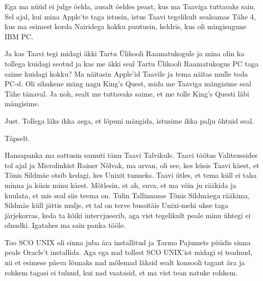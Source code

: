 
Ega ma nüüd ei julge öelda, ausalt öeldes peast, kus ma Taaviga tuttavaks sain. 
Sel ajal, kui mina Apple'te taga istusin, istus Taavi tegelikult sealsamas Tähe 
4, kus ma esimest korda Nairidega kokku puutusin, keldris, kus oli mingisugune 
IBM PC.

Ja kas Taavi tegi midagi äkki Tartu Ülikooli Raamatukogule ja mina olin ka tollega kuidagi seotud ja kas me äkki seal 
Tartu Ülikooli Raamatukogus PC taga saime kuidagi kokku? Ma näitasin Apple'id 
Taavile ja tema näitas mulle toda PC-d. Oli sihukene mäng nagu King's 
Quest, mida me Taaviga mängisime seal Tähe tänaval. 
Ja noh, sealt me tuttavaks saime, et me tolle King's Questi läbi mängisime.


Just. Tollega läks ikka aega, et lõpuni mängida,  istusime ikka palju õhtuid 
seal.


Täpselt. 


Hansapanka ma sattusin samuti tänu Taavi Talvikule. 
Taavi töötas Valitsussides tol ajal ja 
Microlinkist Rainer Nõlvak, ma 
arvan, oli see, kes küsis Taavi käest,  et Tõnis Sildmäe otsib kedagi, kes Unixit tunneks. Taavi ütles, et tema küll ei taha 
minna ja küsis minu käest. Mõtlesin, et ah, suva, et ma võin ju rääkida ja 
kuulata, et mis seal siis teema on. Tulin Tallinnasse Tõnis Sildmäega rääkima, 
Sildmäe küll jättis mulje, et tal on terve bussitäis Unixi-mehi ukse taga 
järjekorras, keda ta kõiki intervjueerib, aga vist tegelikult peale minu ühtegi 
ei olnudki. Igatahes ma sain panka tööle.

Too SCO UNIX oli sinna juba ära installitud ja Tarmo 
Pajumets püüdis  sinna peale Oracle't 
installida. Aga ega nad tollest SCO UNIX'ist midagi ei teadnud, nii et esimese 
päeva lõunaks nad mõlemad läksid sealt konsooli tagant ära ja rohkem  
tagasi ei tulnud, kui nad vaatasid, et ma vist tean natuke rohkem.

